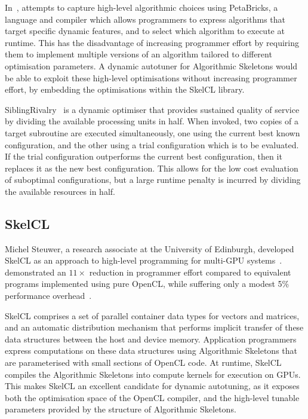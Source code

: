 In~\cite{Ansel2009a}, \citeauthor{Ansel2009a} attempts to capture
high-level algorithmic choices using PetaBricks, a language and
compiler which allows programmers to express algorithms that target
specific dynamic features, and to select which algorithm to execute at
runtime. This has the disadvantage of increasing programmer effort by
requiring them to implement multiple versions of an algorithm tailored
to different optimisation parameters. A dynamic autotuner for
Algorithmic Skeletons would be able to exploit these high-level
optimisations without increasing programmer effort, by embedding the
optimisations within the SkelCL library.

SiblingRivalry~\cite{Ansel2012} is a dynamic optimiser that provides
sustained quality of service by dividing the available processing
units in half. When invoked, two copies of a target subroutine are
executed simultaneously, one using the current best known
configuration, and the other using a trial configuration which is to
be evaluated. If the trial configuration outperforms the current best
configuration, then it replaces it as the new best configuration. This
allows for the low cost evaluation of suboptimal configurations, but a
large runtime penalty is incurred by dividing the available resources
in half.

\subsection{SkelCL}
Michel Steuwer, a research associate at the University of Edinburgh,
developed SkelCL as an approach to high-level programming for
multi-GPU systems~\cite{Steuwer2011,
  Steuwer2013a}. \citeauthor{Steuwer2012} demonstrated an $11\times$
reduction in programmer effort compared to equivalent programs
implemented using pure OpenCL, while suffering only a modest 5\%
performance overhead~\cite{Steuwer2012}.

SkelCL comprises a set of parallel container data types for vectors
and matrices, and an automatic distribution mechanism that performs
implicit transfer of these data structures between the host and device
memory. Application programmers express computations on these data
structures using Algorithmic Skeletons that are parameterised with
small sections of OpenCL code. At runtime, SkelCL compiles the
Algorithmic Skeletons into compute kernels for execution on GPUs. This
makes SkelCL an excellent candidate for dynamic autotuning, as it
exposes both the optimisation space of the OpenCL compiler, and the
high-level tunable parameters provided by the structure of Algorithmic
Skeletons.
